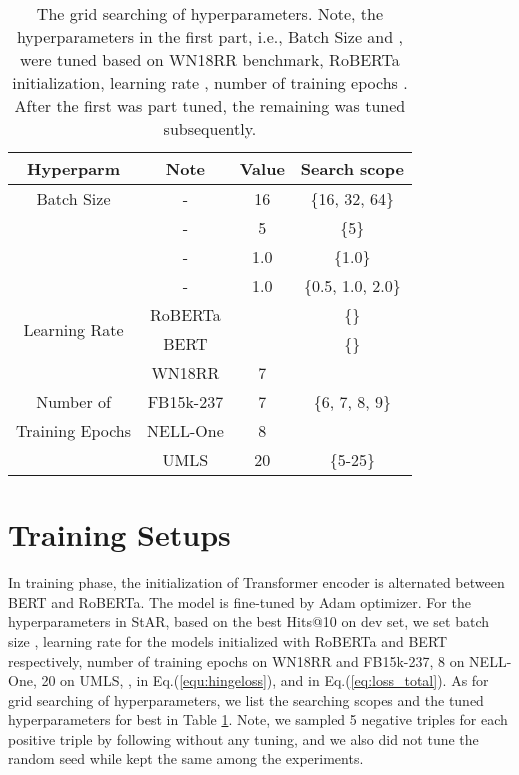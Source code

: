 \documentclass[sigconf]{acmart}
\begin{document}




\appendix


\begin{table}[t] \small
\setlength{\tabcolsep}{2pt}
    \centering
    \caption{\small The grid searching of hyperparameters. Note, the hyperparameters in the first part, i.e., Batch Size and , were tuned based on WN18RR benchmark, RoBERTa initialization, learning rate , number of training epochs . After the first was part tuned, the remaining was tuned subsequently. }
    \label{tab:hyperpar}
    \begin{tabular}{c|ccc} \hline
        \textbf{Hyperparm} &\textbf{Note}  &\textbf{Value}  &\textbf{Search scope} \\ \hline
        Batch Size     & -  &16     &\{16, 32, 64\} \\
            & -  &5      & \{5\} \\
          & -      &1.0    & \{1.0\} \\ 
           & -      &1.0    & \{0.5, 1.0, 2.0\} \\ \hline
        \multirow{2}{*}{Learning Rate}   & RoBERTa  &    &\multirow{1}{*}{\{\} } \\
        ~   & BERT   &    &\multirow{1}{*}{\{\}} \\ \hline
        ~    &WN18RR  & 7     & \multirow{3}{*}{\{6, 7, 8, 9\}} \\ 
        \multirow{1}{*}{Number of}   &FB15k-237 & 7 &~ \\
        \multirow{1}{*}{Training Epochs}   &NELL-One  &8  &~ \\ \cline{2-4}
        ~   &UMLS  &20 &\multirow{1}{*}{\{5-25\}}  \\ \hline
        
    \end{tabular}
\end{table}


\section{Training Setups} \label{app:train_setup}
In training phase, the initialization of Transformer encoder is alternated between BERT and RoBERTa. The model is fine-tuned by Adam optimizer. 
For the hyperparameters in StAR, based on the best Hits@10 on dev set, we set batch size , learning rate  for the models initialized with RoBERTa and BERT respectively, number of training epochs  on WN18RR and FB15k-237, 8 on NELL-One, 20 on UMLS, ,  in Eq.(\ref{equ:hingeloss}), and  in Eq.(\ref{eq:loss_total}). As for grid searching of hyperparameters, we list the searching scopes and the tuned hyperparameters for best in Table \ref{tab:hyperpar}. 
Note, we sampled 5 negative triples for each positive triple by following \citet{yao2019kgbert} without any tuning, and we also did not tune the random seed while kept the same among the experiments. 
\end{document}
